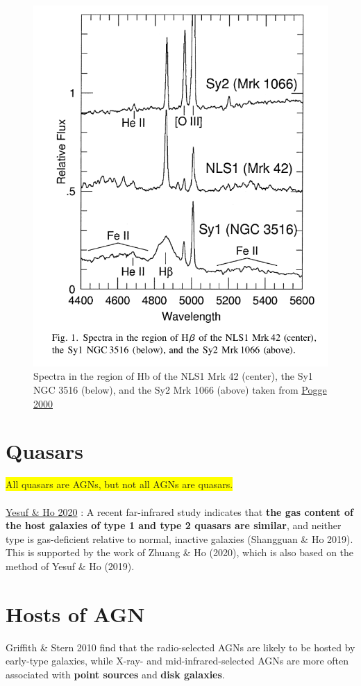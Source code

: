 \begin{figure}
    \centering
    \includegraphics{Notes_Images/SeyfertsSpectra_Pogge.png}
    \caption{Spectra in the region of Hb of the NLS1 Mrk 42 (center),
the Sy1 NGC 3516 (below), and the Sy2 Mrk 1066 (above) taken from \href{https://reader.elsevier.com/reader/sd/pii/S1387647300000658?token=660DD777DEA7E41F7AD39364C79E4FA98C1E0C5C81431C48635052498601540CC37DC9AC7BA43B3AADF61AA5A59524EB&originRegion=eu-west-1&originCreation=20230127115455}{Pogge 2000}}
    \label{fig:seyfert_spectra}
\end{figure}

\section{Quasars}

\colorbox{yellow}{All quasars are AGNs, but not all AGNs are quasars.}\\
\\
 \href{https://arxiv.org/pdf/2007.12026.pdf}{Yesuf \& Ho 2020} : A recent far-infrared study indicates that \textbf{the gas content of the host galaxies of type 1 and type 2 quasars are similar}, and neither type is gas-deficient relative to normal, inactive galaxies (Shangguan \& Ho 2019). This is supported by the work of Zhuang \& Ho (2020), which is also based on the method of Yesuf \& Ho (2019).

\section{Hosts of AGN}
Griffith \& Stern 2010 find that the radio-selected AGNs are likely to be hosted by early-type galaxies, while X-ray- and mid-infrared-selected AGNs are more often associated with \textbf{point sources} and \textbf{disk galaxies}. 